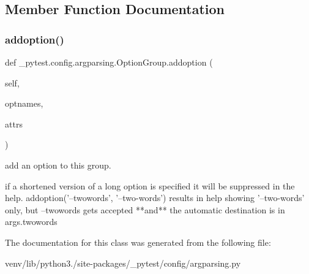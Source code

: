 \subsection{Member Function Documentation}
\mbox{\label{class__pytest_1_1config_1_1argparsing_1_1_option_group_a4fc637e3a67d3ab6209499ad98b005a1}} 
\subsubsection{\texorpdfstring{addoption()}{addoption()}}
{\footnotesize\ttfamily def \+\_\+pytest.\+config.\+argparsing.\+Option\+Group.\+addoption (\begin{DoxyParamCaption}\item[{}]{self,  }\item[{}]{optnames,  }\item[{}]{attrs }\end{DoxyParamCaption})}

\begin{DoxyVerb}add an option to this group.

if a shortened version of a long option is specified it will
be suppressed in the help. addoption('--twowords', '--two-words')
results in help showing '--two-words' only, but --twowords gets
accepted **and** the automatic destination is in args.twowords
\end{DoxyVerb}
 

The documentation for this class was generated from the following file\+:\begin{DoxyCompactItemize}
\item 
venv/lib/python3./site-\/packages/\+\_\+pytest/config/argparsing.\+py\end{DoxyCompactItemize}
